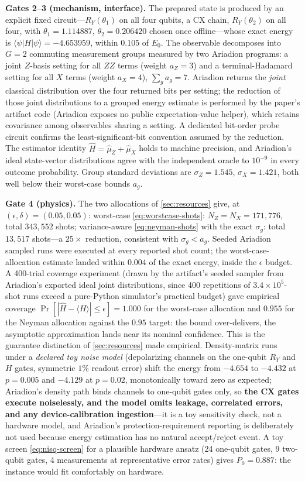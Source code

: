 \textbf{Gates 2--3 (mechanism, interface).} The prepared state is produced by an explicit fixed circuit---$R_Y(\theta_1)$ on all four qubits, a CX chain, $R_Y(\theta_2)$ on all four, with $\theta_1=1.114887$, $\theta_2=0.206420$ chosen once offline---whose exact energy is $\langle\psi|H|\psi\rangle=-4.653959$, within $0.105$ of $E_0$. The observable decomposes into $G=2$ commuting measurement groups measured by two Ariadion programs: a joint $Z$-basis setting for all $ZZ$ terms (weight $a_Z=3$) and a terminal-Hadamard setting for all $X$ terms (weight $a_X=4$), $\sum_g a_g=7$. Ariadion returns the \emph{joint} classical distribution over the four returned bits per setting; the reduction of those joint distributions to a grouped energy estimate is performed by the paper's artifact code (Ariadion exposes no public expectation-value helper), which retains covariance among observables sharing a setting. A dedicated bit-order probe circuit confirms the least-significant-bit convention assumed by the reduction. The estimator identity $\hat H=\hat\mu_Z+\hat\mu_X$ holds to machine precision, and Ariadion's ideal state-vector distributions agree with the independent oracle to $10^{-9}$ in every outcome probability. Group standard deviations are $\sigma_Z=1.545$, $\sigma_X=1.421$, both well below their worst-case bounds $a_g$.

\textbf{Gate 4 (physics).} The two allocations of \cref{sec:resources} give, at $(\epsilon,\delta)=(0.05,0.05)$:
worst-case \eqref{eq:worstcase-shots}: $N_Z=N_X=171{,}776$, total $343{,}552$ shots;
variance-aware \eqref{eq:neyman-shots} with the exact $\sigma_g$: total $13{,}517$ shots---a $25\times$ reduction, consistent with $\sigma_g<a_g$. Seeded Ariadion sampled runs were executed at every reported shot count; the worst-case-allocation estimate landed within $0.004$ of the exact energy, inside the $\epsilon$ budget. A 400-trial coverage experiment (drawn by the artifact's seeded sampler from Ariadion's exported ideal joint distributions, since 400 repetitions of $3.4\times10^5$-shot runs exceed a pure-Python simulator's practical budget) gave empirical coverage $\Pr[|\hat H-\langle H\rangle|\leq\epsilon]=1.000$ for the worst-case allocation and $0.955$ for the Neyman allocation against the $0.95$ target: the bound over-delivers, the asymptotic approximation lands near its nominal confidence. This is the guarantee distinction of \cref{sec:resources} made empirical. Density-matrix runs under a \emph{declared toy noise model} (depolarizing channels on the one-qubit $R_Y$ and $H$ gates, symmetric $1\%$ readout error) shift the energy from $-4.654$ to $-4.432$ at $p=0.005$ and $-4.129$ at $p=0.02$, monotonically toward zero as expected; Ariadion's density path binds channels to one-qubit gates only, so \textbf{the CX gates execute noiselessly, and the model omits leakage, correlated errors, and any device-calibration ingestion}---it is a toy sensitivity check, not a hardware model, and Ariadion's protection-requirement reporting is deliberately not used because energy estimation has no natural accept/reject event. A toy screen \eqref{eq:nisq-screen} for a plausible hardware ansatz (24 one-qubit gates, 9 two-qubit gates, 4 measurements at representative error rates) gives $P_0=0.887$: the instance would fit comfortably on hardware.

